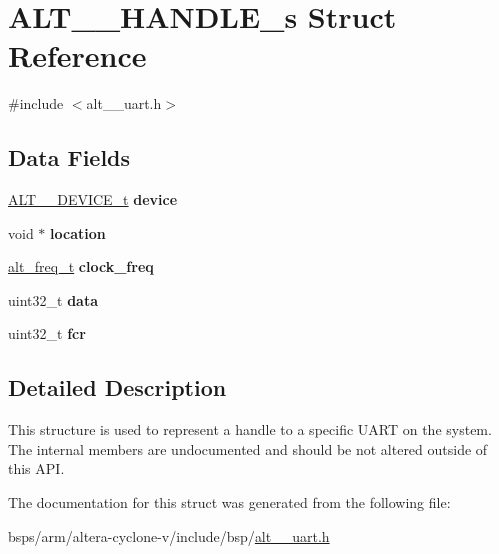 \hypertarget{structALT__16550__HANDLE__s}{}\section{A\+L\+T\+\_\+\_\+\+H\+A\+N\+D\+L\+E\+\_\+s Struct Reference}
\label{structALT__16550__HANDLE__s}


{\ttfamily \#include $<$alt\+\_\+\_\+uart.\+h$>$}

\subsection*{Data Fields}
\begin{DoxyCompactItemize}
\item 
\mbox{\label{structALT__16550__HANDLE__s_acda3323e53e909d6317f62fcf2bd447c}} 
\mbox{\hyperlink{group__UART__BASIC_ga292038e1b11e0a1f05df98abd20c819b}{A\+L\+T\+\_\+\_\+\+D\+E\+V\+I\+C\+E\+\_\+t}} {\bfseries device}
\item 
\mbox{\label{structALT__16550__HANDLE__s_adb564d859c382bb83f8da93f147f5c6c}} 
void $\ast$ {\bfseries location}
\item 
\mbox{\label{structALT__16550__HANDLE__s_a938be4bfd8da0c2d57af1cbfbade3c77}} 
\mbox{\hyperlink{group__CLK__MGR_gaa32fe6dfaa6def16098e0039eb336383}{alt\+\_\+freq\+\_\+t}} {\bfseries clock\+\_\+freq}
\item 
\mbox{\label{structALT__16550__HANDLE__s_a5244dfbb0da1fc92583673d06e28bdfd}} 
uint32\+\_\+t {\bfseries data}
\item 
\mbox{\label{structALT__16550__HANDLE__s_a4fba5a42d74683fac04be0c064d1bfd8}} 
uint32\+\_\+t {\bfseries fcr}
\end{DoxyCompactItemize}


\subsection{Detailed Description}
This structure is used to represent a handle to a specific U\+A\+RT on the system. The internal members are undocumented and should be not altered outside of this A\+PI. 

The documentation for this struct was generated from the following file\+:\begin{DoxyCompactItemize}
\item 
bsps/arm/altera-\/cyclone-\/v/include/bsp/\mbox{\hyperlink{alt__16550__uart_8h}{alt\+\_\+\_\+uart.\+h}}\end{DoxyCompactItemize}
